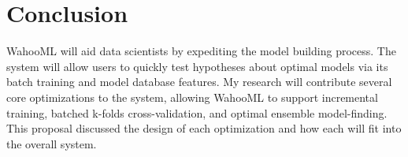 \documentclass[../proposal.tex]{subfiles}
\begin{document}
\section{Conclusion}

WahooML will aid data scientists by expediting the model building process. The
system will allow users to quickly test hypotheses about optimal models via its
batch training and model database features. My research will contribute several
core optimizations to the system, allowing WahooML to support incremental
training, batched k-folds cross-validation, and optimal ensemble model-finding.
This proposal discussed the design of each optimization and how each will fit
into the overall system.
\end{document}
